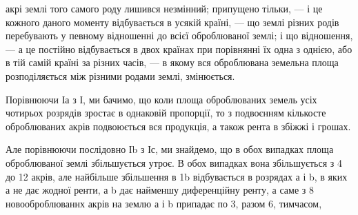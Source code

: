 \parcont{}  %
акрі землі того самого роду лишився незмінний; припущено тільки, — і це кожного
даного моменту відбувається в усякій країні, — що землі різних родів перебувають
у певному відношенні до всієї оброблюваної землі; і що відношення, — а це постійно
відбувається в двох країнах при порівнянні їх одна з однією, або в тій самій
країні за різних часів, — в якому вся оброблювана земельна площа розподіляється
між різними родами землі, змінюється.

Порівнюючи Іа з І, ми бачимо, що коли площа оброблюваних земель усіх
чотирьох розрядів зростає в однаковій пропорції, то з подвоєнням кількосте
оброблюваних акрів подвоюється вся продукція, а також рента в збіжжі і грошах.

Але порівнюючи послідовно Іb з Іс, ми знайдемо, що в обох випадках площа
оброблюваної землі збільшується утроє. В обох випадках вона збільшується з
4 до 12 акрів, але
найбільше збільшення
в 1b відбувається
в розрядах
а і b, в яких
а не дає жодної
ренти, а b дає найменшу
диференційну
ренту, а саме
з 8 новооброблюваннх
акрів
на землю а і b
припадає по 3, разом
6, тимчасом,

